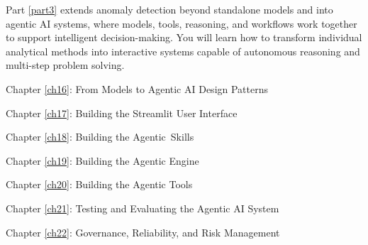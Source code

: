 \label{part3}
Part \ref{part3} extends anomaly detection beyond standalone models and into agentic AI systems, where models, tools, reasoning, and workflows work together to support intelligent decision-making. You will learn how to transform individual analytical methods into interactive systems capable of autonomous reasoning and multi-step problem solving.

\begin{description}[leftmargin=1cm, labelindent=1cm, labelwidth=1cm, align=right, itemsep=0pt, font=\normalfont]
    \item Chapter \ref{ch16}: From Models to Agentic AI Design Patterns
    \item Chapter \ref{ch17}: Building the Streamlit User Interface
    \item Chapter \ref{ch18}: Building the Agentic Skills
    \item Chapter \ref{ch19}: Building the Agentic Engine
    \item Chapter \ref{ch20}: Building the Agentic Tools
    \item Chapter \ref{ch21}: Testing and Evaluating the Agentic AI System
    \item Chapter \ref{ch22}: Governance, Reliability, and Risk Management

\end{description}

